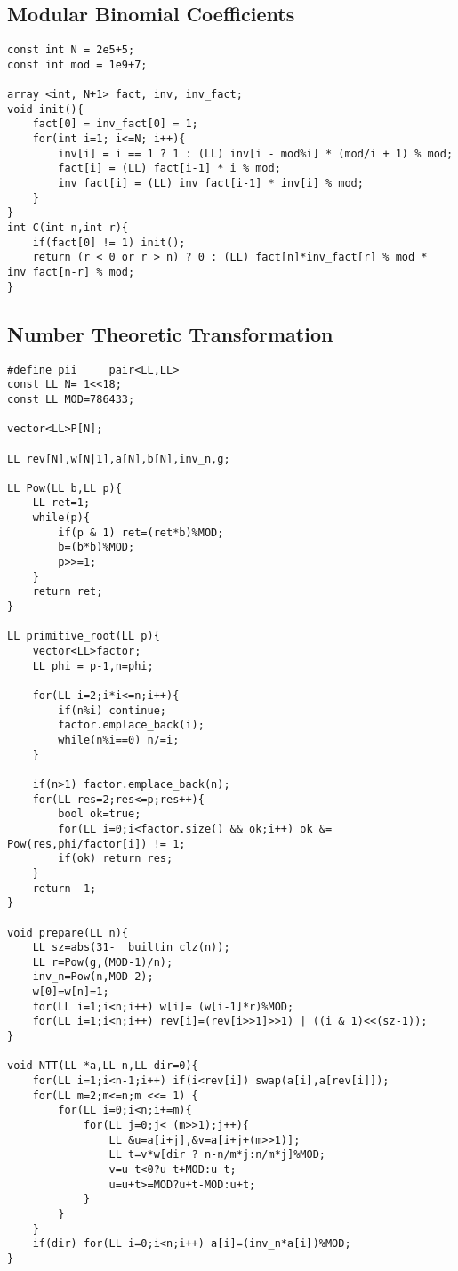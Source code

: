 \documentclass[10pt,a4paper,onesided]{article}
\begin{document}
\begin{multicols*}{3}
\subsection{Modular Binomial Coefficients}
\begin{lstlisting}
const int N = 2e5+5;
const int mod = 1e9+7;

array <int, N+1> fact, inv, inv_fact;
void init(){
    fact[0] = inv_fact[0] = 1;
    for(int i=1; i<=N; i++){
        inv[i] = i == 1 ? 1 : (LL) inv[i - mod%i] * (mod/i + 1) % mod;
        fact[i] = (LL) fact[i-1] * i % mod;
        inv_fact[i] = (LL) inv_fact[i-1] * inv[i] % mod;
    }
}
int C(int n,int r){
    if(fact[0] != 1) init();
    return (r < 0 or r > n) ? 0 : (LL) fact[n]*inv_fact[r] % mod * inv_fact[n-r] % mod;
}
\end{lstlisting}
\subsection{Number Theoretic Transformation}
\begin{lstlisting}
#define pii     pair<LL,LL>
const LL N= 1<<18;
const LL MOD=786433;

vector<LL>P[N];

LL rev[N],w[N|1],a[N],b[N],inv_n,g;

LL Pow(LL b,LL p){
    LL ret=1;
    while(p){
        if(p & 1) ret=(ret*b)%MOD;
        b=(b*b)%MOD;
        p>>=1;
    }
    return ret;
}

LL primitive_root(LL p){
    vector<LL>factor;
    LL phi = p-1,n=phi;

    for(LL i=2;i*i<=n;i++){
        if(n%i) continue;
        factor.emplace_back(i);
        while(n%i==0) n/=i;
    }

    if(n>1) factor.emplace_back(n);
    for(LL res=2;res<=p;res++){
        bool ok=true;
        for(LL i=0;i<factor.size() && ok;i++) ok &= Pow(res,phi/factor[i]) != 1;
        if(ok) return res;
    }
    return -1;
}

void prepare(LL n){
    LL sz=abs(31-__builtin_clz(n));
    LL r=Pow(g,(MOD-1)/n);
    inv_n=Pow(n,MOD-2);
    w[0]=w[n]=1;
    for(LL i=1;i<n;i++) w[i]= (w[i-1]*r)%MOD;
    for(LL i=1;i<n;i++) rev[i]=(rev[i>>1]>>1) | ((i & 1)<<(sz-1));
}

void NTT(LL *a,LL n,LL dir=0){
    for(LL i=1;i<n-1;i++) if(i<rev[i]) swap(a[i],a[rev[i]]);
    for(LL m=2;m<=n;m <<= 1) {
        for(LL i=0;i<n;i+=m){
            for(LL j=0;j< (m>>1);j++){
                LL &u=a[i+j],&v=a[i+j+(m>>1)];
                LL t=v*w[dir ? n-n/m*j:n/m*j]%MOD;
                v=u-t<0?u-t+MOD:u-t;
                u=u+t>=MOD?u+t-MOD:u+t;
            }
        }
    }
    if(dir) for(LL i=0;i<n;i++) a[i]=(inv_n*a[i])%MOD;
}


\end{lstlisting}
\end{multicols*}
\end{document}
